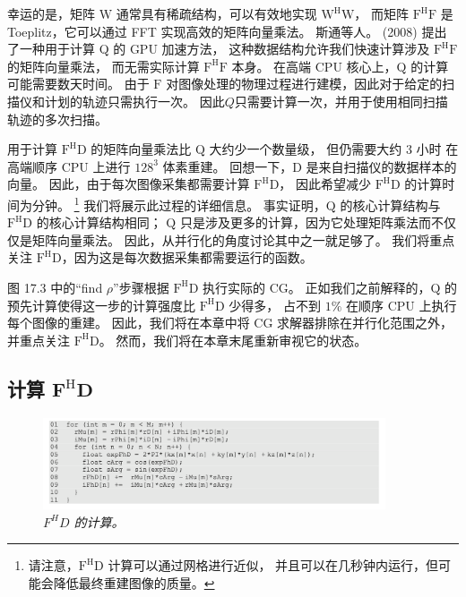 幸运的是，矩阵 $\mathrm{W}$ 通常具有稀疏结构，可以有效地实现 $\mathrm{W}^{\mathrm{H}} \mathrm{W}$，
而矩阵 $\mathrm{F }^{\mathrm{H}} \mathrm{F}$ 是 Toeplitz，它可以通过 FFT 实现高效的矩阵向量乘法。 
斯通等人。 (2008) 提出了一种用于计算 Q 的 GPU 加速方法，
这种数据结构允许我们快速计算涉及 $\mathrm{F}^{\mathrm{H}} \mathrm{F}$ 的矩阵向量乘法，
而无需实际计算 $\mathrm{F}^{\mathrm{H}} \mathrm{F}$ 本身。 
在高端 CPU 核心上，$\mathrm{Q}$ 的计算可能需要数天时间。 
由于 $\mathrm{F}$ 对图像处理的物理过程进行建模，因此对于给定的扫描仪和计划的轨迹只需执行一次。 
因此$Q$只需要计算一次，并用于使用相同扫描轨迹的多次扫描。

用于计算 $\mathrm{F}^{\mathrm{H}} \mathrm{D}$ 的矩阵向量乘法比 $\mathrm{Q}$ 大约少一个数量级，
但仍需要大约 3 小时 在高端顺序 CPU 上进行 $128^{3}$ 体素重建。 回想一下，D 是来自扫描仪的数据样本的向量。 
因此，由于每次图像采集都需要计算 $\mathrm{F}^{\mathrm{H}} \mathrm{D}$，
因此希望减少 $\mathrm{F}^{\mathrm{H}} \mathrm{D}$ 的计算时间为分钟。 
\footnote{请注意，$\mathrm{F}^{\mathrm{H}} \mathrm{D}$ 计算可以通过网格进行近似，
并且可以在几秒钟内运行，但可能会降低最终重建图像的质量。}
我们将展示此过程的详细信息。 
事实证明，$\mathrm{Q}$ 的核心计算结构与 $\mathrm{F}^{\mathrm{H}}\mathrm{D}$ 的核心计算结构相同； 
$\mathrm{Q}$ 只是涉及更多的计算，因为它处理矩阵乘法而不仅仅是矩阵向量乘法。 因此，从并行化的角度讨论其中之一就足够了。 
我们将重点关注 $\mathrm{F}^{\mathrm{H}} \mathrm{D}$，因为这是每次数据采集都需要运行的函数。

图 17.3 中的“find $\rho$”步骤根据 $\mathrm{F}^{\mathrm{H}} \mathrm{D}$ 执行实际的 CG。 
正如我们之前解释的，$\mathrm{Q}$ 的预先计算使得这一步的计算强度比 $\mathrm{F}^{\mathrm{H}} \mathrm{D}$ 少得多，
占不到 $1 \% $ 在顺序 CPU 上执行每个图像的重建。 
因此，我们将在本章中将 CG 求解器排除在并行化范围之外，并重点关注 $\mathrm{F}^{\mathrm{H}} \mathrm{D}$。 
然而，我们将在本章末尾重新审视它的状态。

\subsection{计算 $\mathbf{F}^{\mathrm{H}} \mathbf{D}$}
\begin{figure}[H]
	\centering
	\includegraphics[width=0.9\textwidth]{figs/F17.4.png}
	\caption{\textit{$F^H D$ 的计算。}}
\end{figure}

